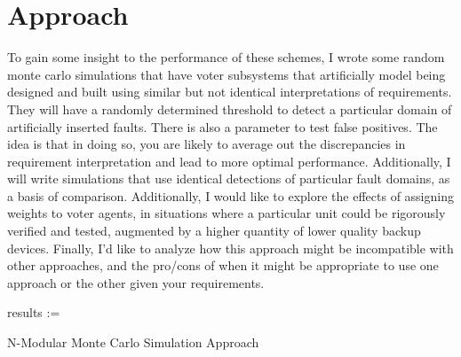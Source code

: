 \documentclass[article]{IEEEtran}
\begin{document}
\section{Approach}
To gain some insight to the performance of these schemes, I wrote some random monte carlo simulations that have voter subsystems that artificially model being designed and built using similar but not identical interpretations of requirements. They will have a randomly determined threshold to detect a particular domain of artificially inserted faults. There is also a parameter to test false positives. The idea is that in doing so, you are likely to average out the discrepancies in requirement interpretation and lead to more optimal performance. Additionally, I will write simulations that use identical detections of particular fault domains, as a basis of comparison.  Additionally, I would like to explore the effects of assigning weights to voter agents, in situations where a particular unit could be rigorously verified and tested, augmented by a higher quantity of lower quality backup devices. Finally, I’d like to analyze how this approach might be incompatible with other approaches, and the pro/cons of when it might be appropriate to use one approach or the other given your requirements. 

\begin{algorithm}
    results := 
    \caption{N-Modular Monte Carlo Simulation Approach}
\end{algorithm}
\end{document}
